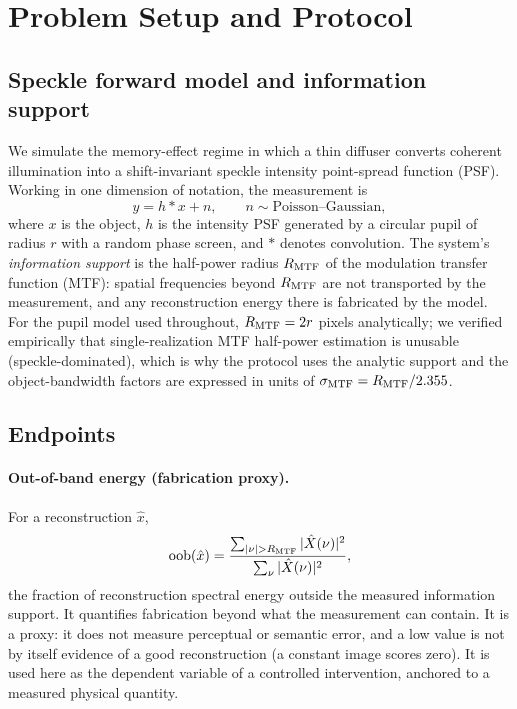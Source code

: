 \section{Problem Setup and Protocol}
\label{sec:setup}

\subsection{Speckle forward model and information support}
We simulate the memory-effect regime in which a thin diffuser converts coherent illumination into a shift-invariant speckle intensity point-spread function (PSF). Working in one dimension of notation, the measurement is
\begin{equation}
y = h \ast x + n, \qquad n \sim \text{Poisson--Gaussian},
\label{eq:forward}
\end{equation}
where $x$ is the object, $h$ is the intensity PSF generated by a circular pupil of radius $r$ with a random phase screen, and $\ast$ denotes convolution. The system's \emph{information support} is the half-power radius $R_{\operatorname{MTF}}$ of the modulation transfer function (MTF): spatial frequencies beyond $R_{\operatorname{MTF}}$ are not transported by the measurement, and any reconstruction energy there is fabricated by the model. For the pupil model used throughout, $R_{\operatorname{MTF}} = 2r$ pixels analytically; we verified empirically that single-realization MTF half-power estimation is unusable (speckle-dominated), which is why the protocol uses the analytic support and the object-bandwidth factors are expressed in units of $\sigma_{\operatorname{MTF}} = R_{\operatorname{MTF}}/2.355$.

\subsection{Endpoints}
\paragraph{Out-of-band energy (fabrication proxy).}
For a reconstruction $\hat{x}$,
\begin{equation}
\mathrm{oob}(\hat{x}) = \frac{\sum_{|\nu| > R_{\operatorname{MTF}}} |\hat{X}(\nu)|^2}{\sum_{\nu} |\hat{X}(\nu)|^2},
\label{eq:oob}
\end{equation}
the fraction of reconstruction spectral energy outside the measured information support. It quantifies fabrication beyond what the measurement can contain. It is a proxy: it does not measure perceptual or semantic error, and a low value is not by itself evidence of a good reconstruction (a constant image scores zero). It is used here as the dependent variable of a controlled intervention, anchored to a measured physical quantity.

